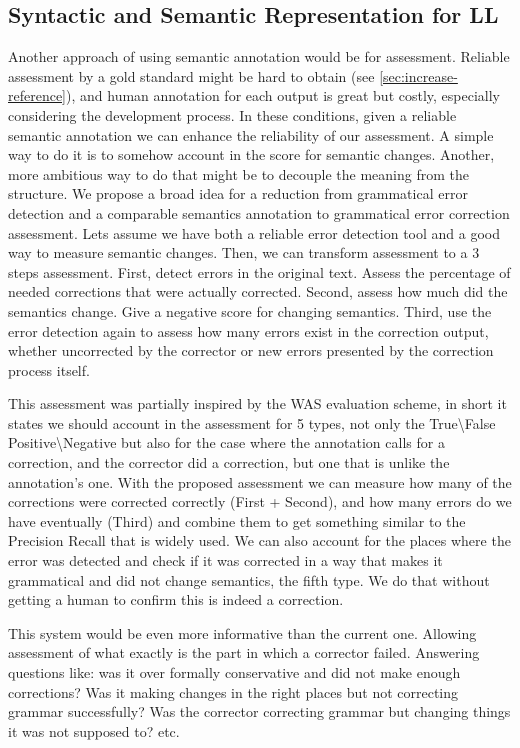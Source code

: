 \documentclass[english]{article}
\begin{document}
\subsection{Syntactic and Semantic Representation for LL}

Another approach of using semantic annotation would be for assessment.
Reliable assessment by a gold standard might be hard to obtain (see
\ref{sec:increase-reference}), and human annotation for each output
is great \cite{madnani2011they} but costly, especially considering the
development process. In these conditions,
given a reliable semantic annotation we can enhance the reliability
of our assessment. A simple way to do it is to somehow account in the
score for semantic changes. Another, more ambitious way to do that might be to decouple the meaning
from the structure. We propose a broad idea for a reduction from grammatical
error detection and a comparable semantics annotation to grammatical
error correction assessment. Lets assume we have both a reliable error
detection tool and a good way to measure semantic changes. Then, we
can transform assessment to a 3 steps assessment. First, detect errors
in the original text. Assess the percentage of needed corrections
that were actually corrected. Second, assess how much did the semantics change.
 Give a negative score for changing semantics. Third, use
the error detection again to assess how many errors exist in the correction
output, whether uncorrected by the corrector or new errors presented
by the correction process itself. 

This assessment was partially inspired by the WAS evaluation scheme\cite{chodorow2012problems},
in short it states we should account in the assessment for 5 types,
not only the True\textbackslash{}False Positive\textbackslash{}Negative
but also for the case where the annotation calls for a correction,
and the corrector did a correction, but one that is unlike the annotation's
one. With the proposed assessment we can measure how many of the corrections
were corrected correctly (First + Second), and how many errors do
we have eventually (Third) and combine them to get something similar
to the Precision Recall that is widely used. We can also account for
the places where the error was detected and check if it was corrected
in a way that makes it grammatical and did not change semantics, the
fifth type. We do that without getting a human to confirm this is
indeed a correction.

This system would be even more informative than the current one. Allowing assessment of
what exactly is the part in which a corrector failed. Answering questions
like: was it over formally conservative and did not make enough corrections?
Was it making changes in the right places but not correcting grammar
successfully? Was the corrector correcting grammar but changing things
it was not supposed to? etc.
\end{document}
